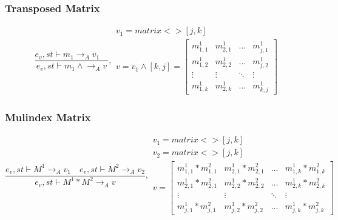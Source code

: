 \subsubsection{Transposed Matrix}
\begin{equation}
	\frac { { e }_{ v },st\vdash { m }_{ 1 }{ \rightarrow  }_{ A }{ v }_{ 1 }\quad  }{ { e }_{ v },st\vdash { m }_{ 1 }\wedge { \rightarrow  }_{ A }{ v } } ,\begin{matrix} { v }_{ 1 }=matrix<>[j,k] \\ { v }={ v }_{ 1 }\wedge[k,j] =\begin{bmatrix} { { m }_{ 1,1 }^{ 1 } } & { { m }_{ 2,1 }^{ 1 } } & \dots  & { m }_{ j,1 }^{ 1 } \\
{ { m }_{ 1,2 }^{ 1 } }  &  { { m }_{ 2,2 }^{ 1 } } & \dots & { m }_{ j,2 }^{ 1 }
\\ \vdots  & \vdots & \ddots  & \vdots \\
 { m }_{ 1,k }^{ 1 } & { m }_{ 2,k }^{ 1 } & \dots & { m }_{ k,j }^{ 1 } \end{bmatrix} \end{matrix}
\end{equation}

\subsubsection{Mulindex Matrix}
\begin{equation}
	\frac { { e }_{ v },st\vdash { M }^{ 1 }{ \rightarrow  }_{ A }{ v }_{ 1 }\quad { e }_{ v },st\vdash { M }^{ 2 }{ \rightarrow  }_{ A }{ v }_{ 2 } }{ { e }_{ v },st\vdash { M }^{ 1 }\ast { M }^{ 2 }{ \rightarrow  }_{ A }{ v } } ,\begin{matrix} { v }_{ 1 }=matrix<>[j,k] \\ { { v }_{ 2 } }=matrix<>[j,k] \\ v=\begin{bmatrix} { { m }_{ 1,1 }^{ 1 } } * { { m }_{ 1,1 }^{ 2 } } & { { m }_{ 2,1 }^{ 1 } } * { { m }_{ 2,1 }^{ 2 } } & \dots  & { m }_{ 1,k }^{ 1 } * { { m }_{ 1,k }^{ 2} } \\
{ { m }_{ 2,1 }^{ 1 } } * { { m }_{ 2,1 }^{ 2 } } &  { { m }_{ 2,2 }^{ 1 } } * { { m }_{ 2,2 }^{ 2 } } & \dots & { { m }_{ 2,k }^{ 1 } }  * { { m }_{ 2,k }^{ 2 } }
\\ \vdots  & \vdots & \ddots  & \vdots \\
 { m }_{ j,1 }^{ 1 } * { { m }_{ j,1 }^{ 2 } } & { { m }_{ j,2 }^{ 1 } } * { { m }_{ j,2 }^{ 2 } }  & \dots & { m }_{ j,k }^{ 1 } * { { m }_{ j,k }^{ 2 } } \end{bmatrix} \end{matrix}
\end{equation}

